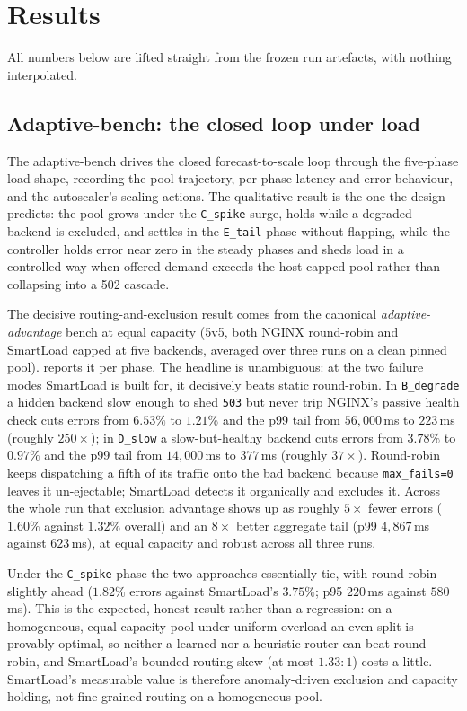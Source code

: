 \section{Results}\label{imc:results}

All numbers below are lifted straight from the frozen run artefacts, with nothing
interpolated.

\subsection{Adaptive-bench: the closed loop under load}\label{imc:results_adaptive}

The adaptive-bench drives the closed forecast-to-scale loop through the five-phase
load shape, recording the pool trajectory, per-phase latency and error behaviour, and
the autoscaler's scaling actions. The qualitative result is the one the design
predicts: the pool grows under the \texttt{C\_spike} surge, holds while a degraded
backend is excluded, and settles in the \texttt{E\_tail} phase without flapping, while
the controller holds error near zero in the steady phases and sheds load in a controlled
way when offered demand exceeds the host-capped pool rather than collapsing into a 502
cascade.

The decisive routing-and-exclusion result comes from the canonical
\emph{adaptive-advantage} bench at equal capacity (5v5, both NGINX round-robin and
SmartLoad capped at five backends, averaged over three runs on a clean pinned pool).
 reports it per phase. The headline is unambiguous: at the two
failure modes SmartLoad is built for, it decisively beats static round-robin. In
\texttt{B\_degrade} a hidden backend slow enough to shed \texttt{503} but never trip
NGINX's passive health check cuts errors from $6.53\%$ to $1.21\%$ and the p99 tail from
$56{,}000$\,ms to $223$\,ms (roughly $250\times$); in \texttt{D\_slow} a slow-but-healthy
backend cuts errors from $3.78\%$ to $0.97\%$ and the p99 tail from $14{,}000$\,ms to
$377$\,ms (roughly $37\times$). Round-robin keeps dispatching a fifth of its traffic onto
the bad backend because \texttt{max\_fails=0} leaves it un-ejectable; SmartLoad detects
it organically and excludes it. Across the whole run that exclusion advantage shows up as
roughly $5\times$ fewer errors ($1.60\%$ against $1.32\%$ overall) and an $8\times$ better
aggregate tail (p99 $4{,}867$\,ms against $623$\,ms), at equal capacity and robust across
all three runs.

Under the \texttt{C\_spike} phase the two approaches essentially tie, with round-robin
slightly ahead ($1.82\%$ errors against SmartLoad's $3.75\%$; p95 $220$\,ms against
$580$\,ms). This is the expected, honest result rather than a regression: on a
homogeneous, equal-capacity pool under uniform overload an even split is provably
optimal, so neither a learned nor a heuristic router can beat round-robin, and
SmartLoad's bounded routing skew (at most $1.33{:}1$) costs a little. SmartLoad's
measurable value is therefore anomaly-driven exclusion and capacity holding, not
fine-grained routing on a homogeneous pool.

